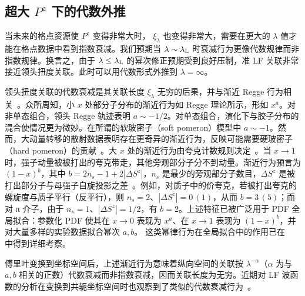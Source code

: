 \subsection{超大 $P^z$ 下的代数外推}

当未来的格点资源使 $P^z$ 变得非常大时，
$\xi_\lambda$ 也变得非常大，需要在更大的 $\lambda$ 值才能在格点数据中看到指数衰减。我们预期当 $\lambda\sim\lambda_{\rm L}$ 时衰减行为更像代数规律而非指数规律。换言之，由于 $\lambda \le \lambda_{\rm L}$ 的幂次修正预期受到良好压制，准 LF 关联非常接近领头扭度关联。此时可以用代数形式外推到 $\lambda=\infty$。


领头扭度关联的代数衰减是其关联长度 $\xi_\lambda$ 无穷的后果，并与渐近 Regge 行为相关~\cite{Regge:1959mz}。众所周知，小 $x$ 处部分子分布的渐近行为如 Regge 理论所示，形如 $x^a$。对非单态组合，领头 Regge 轨迹表明 $a\sim-1/2$。对单态组合，演化下与胶子分布的混合使情况更为微妙。在所谓的软玻密子（soft pomeron）模型中 $a\sim -1$。然而，大动量转移的散射数据表明存在更奇异的渐近行为，反映可能需要硬玻密子（hard pomeron）的贡献~\cite{Devenish:2004pb}。大 $x$ 处的渐近行为由夸克计数规则决定~\cite{Brodsky:1973kr}。当 $x\to 1$ 时，强子动量被被打出的夸克带走，其他旁观部分子分不到动量。渐近行为预言为 $(1-x)^b$，其中 $b=2n_s-1+2|\Delta S^z|$，$n_s$ 是最少的旁观部分子数目，$\Delta S^z$ 是被打出部分子与母强子自旋投影之差~\cite{Devenish:2004pb,Brodsky:2005wx}。例如，对质子中的价夸克，若被打出夸克的螺旋度与质子平行（反平行），则 $n_s=2$、$|\Delta S^z|= 0\, (1)$，从而 $b=3\, (5)$；而对 π 介子，由于 $n_s=1$、$|\Delta S^z|=1/2$，有 $b=2$。上述特征已被广泛用于 PDF 全局拟合：参数化 PDF 使其在 $x\to 0$ 表现为 $x^a$、在 $x\to 1$ 表现为 $(1-x)^b$，并对大量多样的实验数据拟合幂次 $a, b$。
这类幂律行为在全局拟合中的作用已在 ~\cite{Ball:2016spl,Nocera:2014uea} 中得到详细考察。

傅里叶变换到坐标空间后，上述渐近行为意味着纵向空间的关联按 $\lambda^{-\alpha}$（$\alpha$ 为与 $a, b$ 相关的正数）代数衰减而非指数衰减，因而关联长度为无穷。近期对 LF 波函数的分析在变换到共轭坐标空间时也观察到了类似的代数衰减行为~\cite{Brodsky:1997de,Miller:2019ysh}。

